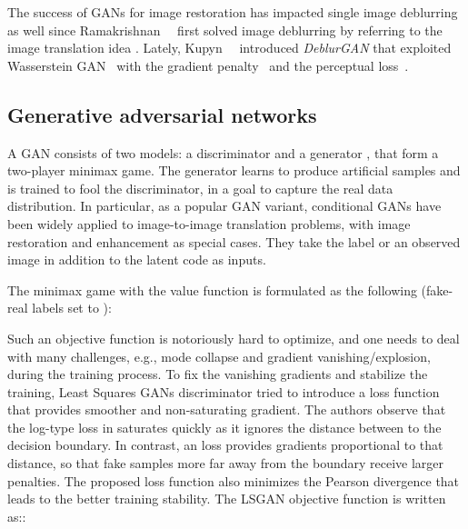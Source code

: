 \documentclass[10pt,twocolumn,letterpaper]{article}
\begin{document}
The success of GANs for image restoration has impacted single image deblurring as well since Ramakrishnan~\etal~\cite{DeepGF} first solved image deblurring by referring to the image translation idea \cite{pix2pix}. Lately, Kupyn~\etal~\cite{kupyn2018deblurgan} introduced \textit{DeblurGAN} that exploited Wasserstein GAN~\cite{WGAN} with the gradient penalty~\cite{WGAN-GP} and the perceptual loss~\cite{Johnson2016Perceptual}.










\subsection{Generative adversarial networks}
\vspace{-0.5em}
A GAN \cite{GAN} consists of two
models: a discriminator  and a generator , that form a two-player minimax game. 
The generator learns to produce artificial samples and is trained to fool the discriminator, in a goal to capture the real data distribution. In particular, as a popular GAN variant, conditional GANs \cite{CGAN} have been widely applied to image-to-image translation problems, with image restoration and enhancement as special cases. They take the label or an observed image in addition to the latent code as inputs.



The minimax game with the value function  is formulated as the following \cite{GAN} (fake-real labels set to ):

Such an objective function is notoriously hard to optimize, and one needs to deal with many challenges, e.g., mode collapse and gradient vanishing/explosion, during the training process. To fix the vanishing gradients and stabilize the training, Least Squares GANs discriminator \cite{LSGAN} tried to introduce a loss function that provides smoother and non-saturating gradient. 
The authors observe that the log-type loss in \cite{GAN} saturates quickly as it ignores the distance between  to the decision boundary. In contrast, an  loss provides gradients proportional to that distance, so that fake samples more far away from the boundary receive larger penalties. 
The proposed loss function also minimizes the Pearson  divergence that leads to the better training stability. 
The LSGAN objective function is written as::
\end{document}
